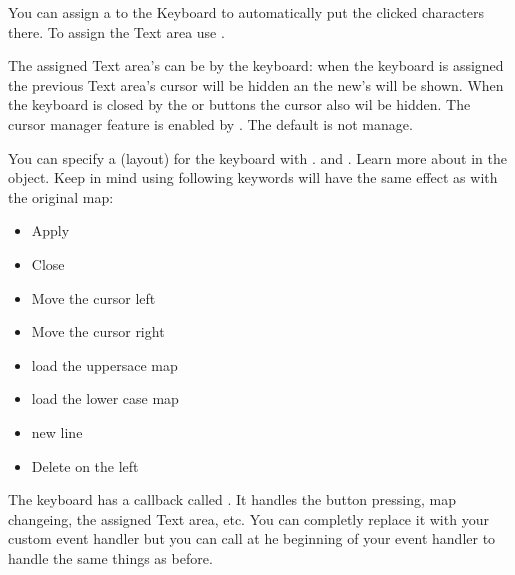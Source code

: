 \documentclass[letterpaper,10pt,english]{sphinxmanual}
\begin{document}
You can assign a {\hyperref[\detokenize{object-types/ta::doc}]{}} to the Keyboard to automatically put the clicked characters there.
To assign the Text area use .

The assigned Text area’s  can be  by the keyboard: when the keyboard is assigned the previous Text area’s cursor will be hidden an the new’s will be shown.
When the keyboard is closed by the  or  buttons the cursor also wil be hidden. The cursor manager feature is enabled by . The default is not manage.

You can specify a  (layout) for the keyboard with . and .
Learn more about in the {\hyperref[\detokenize{object-types/btnm::doc}]{}} object.
Keep in mind using following keywords will have the same effect as with the original map:
\begin{itemize}
\item {} 
 Apply

\item {} 
 Close

\item {} 
 Move the cursor left

\item {} 
 Move the cursor right

\item {} 
 load the uppersace map

\item {} 
 load the lower case map

\item {} 
 new line

\item {} 
 Delete on the left

\end{itemize}

The keyboard has a  callback called .
It handles the button pressing, map changeing, the assigned Text area, etc.
You can completly replace it with your custom event handler but you can call  at he beginning of your event handler to handle the same things as before.
\end{document}
